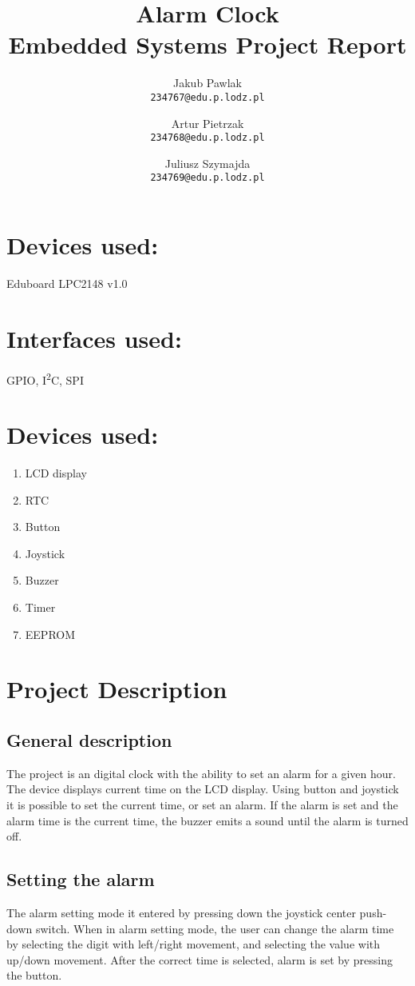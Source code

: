 \documentclass[11pt]{article}
\title{\huge\bf\vspace{-1em} Alarm Clock \\ Embedded Systems Project Report\\\vspace{2em}{\large\normalfont Monday 10:00 lab} }
\author{
    Jakub Pawlak \\
    \texttt{234767@edu.p.lodz.pl}
    \and
    Artur Pietrzak \\
    \texttt{234768@edu.p.lodz.pl}
    \and
    Juliusz Szymajda \\
    \texttt{234769@edu.p.lodz.pl}
}
\begin{document}
    \maketitle
    \clearpage
    \large
    \section*{Devices used:}
    Eduboard LPC2148 v1.0
    \section*{Interfaces used:}
    GPIO, I\textsuperscript{2}C, SPI
    \section*{Devices used:}
    \begin{enumerate}
        \item LCD display
        \item RTC
        \item Button
        \item Joystick
        \item Buzzer
        \item Timer
        \item EEPROM
    \end{enumerate}
    \clearpage
    \tableofcontents
    \clearpage

    \section{Project Description}
    \subsection{General description}
    The project is an digital clock with the ability to set an alarm for a given hour.
    The device displays current time on the LCD display.
    Using button and joystick it is possible to set the current time, or set an alarm.
    If the alarm is set and the alarm time is the current time, the buzzer emits a sound until the alarm is turned off.

    \subsection{Setting the alarm}
    The alarm setting mode it entered by pressing down the joystick center push-down switch.
    When in alarm setting mode, the user can change the alarm time by selecting the digit with left/right movement, and selecting the value with up/down movement.
    After the correct time is selected, alarm is set by pressing the button.
\end{document}
